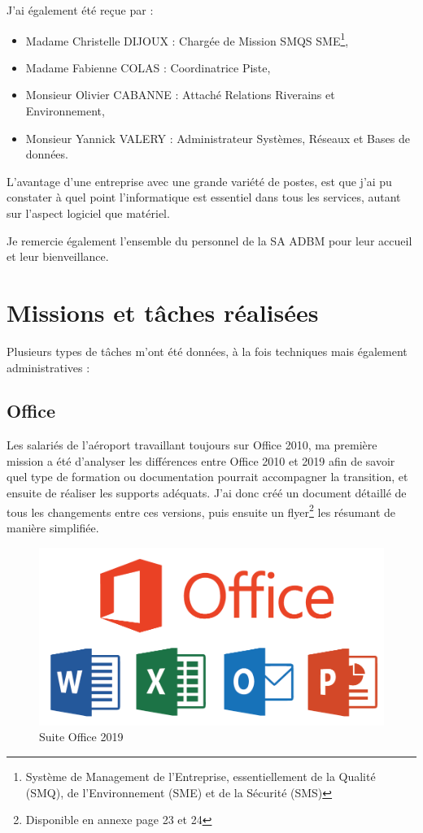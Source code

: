 J'ai également été reçue par :

\begin{itemize}
    \item Madame Christelle DIJOUX : Chargée de Mission SMQS SME\footnote{Système de Management de l'Entreprise, essentiellement de la Qualité (SMQ), de l'Environnement (SME) et de la Sécurité (SMS)},
    \item Madame Fabienne COLAS : Coordinatrice Piste,
    \item Monsieur Olivier CABANNE : Attaché Relations Riverains et Environnement,
    \item Monsieur Yannick VALERY : Administrateur Systèmes, Réseaux et Bases de données.\newline
\end{itemize}

L'avantage d'une entreprise avec une grande variété de postes, est que j'ai pu constater à quel point l'informatique est essentiel dans tous les services, autant sur l'aspect logiciel que matériel.

Je remercie également l'ensemble du personnel de la SA ADBM pour leur accueil et leur bienveillance. 

\section{Missions et tâches réalisées}

Plusieurs types de tâches m’ont été données, à la fois techniques mais également administratives :\

\subsection{Office}

Les salariés de l’aéroport travaillant toujours sur Office 2010, ma première mission a été d’analyser les différences entre Office 2010 et 2019 afin de savoir quel type de formation ou documentation pourrait accompagner la transition, et ensuite de réaliser les supports adéquats. J’ai donc créé un document détaillé de tous les changements entre ces versions, puis ensuite un flyer\footnote{Disponible en annexe page 23 et 24} les résumant de manière simplifiée.\newline


\begin{figure}[hbt!]
  \centering
  \includegraphics[width=12cm]{Images/office.png}
  \caption{Suite Office 2019}
  \label{fig:office}
\end{figure}

